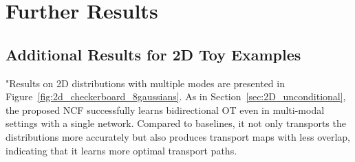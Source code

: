 \documentclass{article} %
\theoremstyle{plain}
\theoremstyle{definition}
\theoremstyle{remark}
\begin{document}
\section{Further Results} 

\subsection{Additional Results for 2D Toy Examples}\label{appen:2dtoy}
"Results on 2D distributions with multiple modes are presented in Figure~\ref{fig:2d_checkerboard_8gaussians}. As in Section~\ref{sec:2D_unconditional}, the proposed NCF successfully learns bidirectional OT even in multi-modal settings with a single network. Compared to baselines, it not only transports the distributions more accurately but also produces transport maps with less overlap, indicating that it learns more optimal transport paths.
\end{document}
